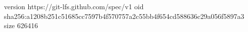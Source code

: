 version https://git-lfs.github.com/spec/v1
oid sha256:a1208b251c51685cc7597b4f570757a2c55bb4f654cd588636c29a056f5897a3
size 626416

